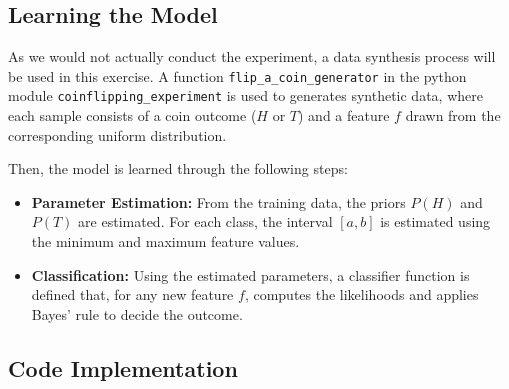 \documentclass[12pt]{article}
\begin{document}
\subsection*{Learning the Model}
As we would not actually conduct the experiment, a data synthesis process will be used in this exercise. A function \texttt{flip\_a\_coin\_generator} in the python module \texttt{coinflipping\_experiment} is used to generates synthetic data, where each sample consists of a coin outcome (\(H\) or \(T\)) and a feature \(f\) drawn from the corresponding uniform distribution.
    
Then, the model is learned through the following steps:
\begin{itemize}
    \item \textbf{Parameter Estimation:} From the training data, the priors \(P(H)\) and \(P(T)\) are estimated. For each class, the interval \([a, b]\) is estimated using the minimum and maximum feature values.
    \item \textbf{Classification:} Using the estimated parameters, a classifier function is defined that, for any new feature \(f\), computes the likelihoods and applies Bayes' rule to decide the outcome.
\end{itemize}

\subsection*{Code Implementation}
\end{document}
